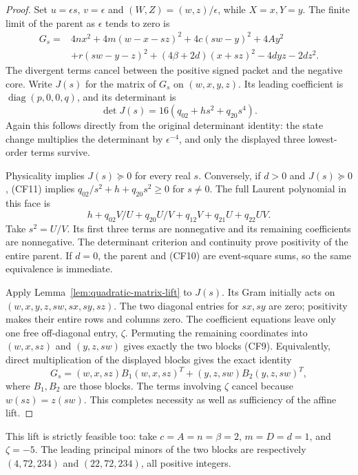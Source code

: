 \begin{proof}
Set $u=\epsilon s$, $v=\epsilon$ and
$(W,Z)=(w,z)/\epsilon$, while $X=x,Y=y$. The finite limit of
the parent as $\epsilon$ tends to zero is
\[
\begin{split}
G_s={}&4nx^2+4m(w-x-sz)^2+4c(sw-y)^2+4Ay^2\\
 &+r(sw-y-z)^2+(4\beta+2d)(x+sz)^2-4dyz-2dz^2.
\end{split}                                               \tag{CF10}
\]
The divergent terms cancel between the positive signed packet and
the negative core. Write $J(s)$ for the matrix of $G_s$ on
$(w,x,y,z)$. Its leading coefficient is
$\operatorname{diag}(p,0,0,q)$, and its determinant is
\[
 \det J(s)=16(q_{02}+hs^2+q_{20}s^4).                      \tag{CF11}
\]
Again this follows directly from the original determinant identity:
the state change multiplies the determinant by $\epsilon^{-4}$,
and only the displayed three lowest-order terms survive.

Physicality implies $J(s)\succeq0$ for every real $s$. Conversely,
if $d>0$ and $J(s)\succeq0$, (CF11) implies
$q_{02}/s^2+h+q_{20}s^2\ge0$ for $s\ne0$. The full Laurent
polynomial in this face is
\[
 h+q_{02}V/U+q_{20}U/V+q_{12}V+q_{21}U+q_{22}UV.
\]
Take $s^2=U/V$. Its first three terms are nonnegative and its
remaining coefficients are nonnegative. The determinant criterion
and continuity prove positivity of the entire parent. If $d=0$,
the parent and (CF10) are event-square sums, so the same equivalence
is immediate.

Apply Lemma~\ref{lem:quadratic-matrix-lift} to $J(s)$. Its Gram
initially acts on $(w,x,y,z,sw,sx,sy,sz)$. The two diagonal entries
for $sx,sy$ are zero; positivity makes their entire rows and columns
zero. The coefficient equations leave only one free off-diagonal
entry, $\zeta$. Permuting the remaining coordinates into
$(w,x,sz)$ and $(y,z,sw)$ gives exactly the two blocks (CF9).
Equivalently, direct multiplication of the displayed blocks gives
the exact identity
\[
 G_s=(w,x,sz)B_1(w,x,sz)^T+(y,z,sw)B_2(y,z,sw)^T,
\]
where $B_1,B_2$ are those blocks. The terms involving $\zeta$
cancel because $w(sz)=z(sw)$. This completes necessity as well
as sufficiency of the affine lift.
\end{proof}

This lift is strictly feasible too: take
$c=A=n=\beta=2$, $m=D=d=1$, and $\zeta=-5$. The leading
principal minors of the two blocks are respectively
$(4,72,234)$ and $(22,72,234)$, all positive integers.

